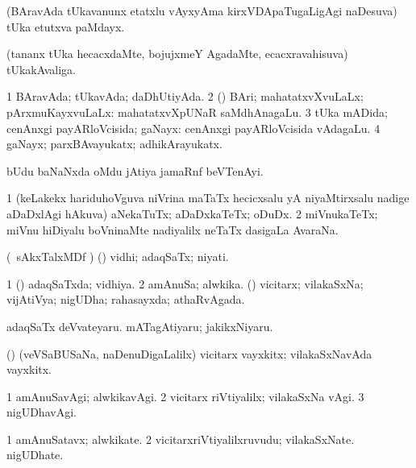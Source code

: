\bentry
{} 
\gl{\nA}
\expl{}
\bmng
(BAravAda tUkavanunx etatxlu vAyxyAma kirxVDApaTugaLigAgi naDesuva) tUka etutxva paMdayx. 
\emng
\eentry

\bentry
{} 
\gl{\nA}
\expl{}
\bmng
(tananx tUka hecacxdaMte, bojujxmeY AgadaMte, ecacxravahisuva) tUkakAvaliga. 
\emng
\eentry

\bentry
{} 
\gl{\gu}
\bmng
\bnum
\num{1} BAravAda; tUkavAda; daDhUtiyAda. 
\num{2} (\rUpa) BAri; mahatatxvXvuLaLx; pArxmuKayxvuLaLx:  mahatatxvXpUNaR saMdhAnagaLu. 
\num{3} tUka mADida; cenAnxgi payARloVcisida; gaNayx:  cenAnxgi payARloVcisida vAdagaLu. 
\num{4} gaNayx; parxBAvayukatx; adhikArayukatx. 
\enum
\emng
\eentry

\bentry
{} 
\gl{\nA}
\expl{}
\bmng
bUdu baNaNxda oMdu jAtiya jamaRnf beVTenAyi. 
\emng
\eentry

\bentry
{} 
\gl{\nA}
\expl{}
\bmng
\bnum
\num{1} (keLakekx hariduhoVguva niVrina maTaTx hecicxsalu yA niyaMtirxsalu nadige aDaDxlAgi hAkuva) aNekaTuTx; aDaDxkaTeTx; oDuDx. 
\num{2} miVnukaTeTx; miVnu hiDiyalu boVninaMte nadiyalilx neTaTx dasigaLa AvaraNa. 
\enum
\emng
\eentry

\bentry
{} 
\gl{\nA}
\expl{}
\bmng
(\kanmu\ sAkxTalxMDf \parx) (\pArxparx) vidhi; adaqSaTx; niyati. 
\emng
\eentry

\bentry
{} 
\gl{\gu}
\expl{}
\bmng
\bnum
\num{1} (\pArxparx) adaqSaTxda; vidhiya. 
\num{2} amAnuSa; alwkika. (\AmA) vicitarx; vilakaSxNa; vijAtiVya; nigUDha; rahasayxda; athaRvAgada. 
\enum
\emng

\noindent 
\gl{\pagu}
\expl{}
\bmng
\banum
{} adaqSaTx deVvateyaru. 
 mATagAtiyaru; jakikxNiyaru. 
\eanum
\emng
\eentry

\bentry
{} 
\gl{\nA}
\expl{}
\bmng
(\AmA) (veVSaBUSaNa, naDenuDigaLalilx) vicitarx vayxkitx; vilakaSxNavAda vayxkitx. 
\emng
\eentry

\bentry
{} 
\gl{\kirxvi}
\expl{}
\bmng
\bnum
\num{1} amAnuSavAgi; alwkikavAgi. 
\num{2} vicitarx riVtiyalilx; vilakaSxNa vAgi. 
\num{3} nigUDhavAgi. 
\enum
\emng
\eentry

\bentry
{} 
\gl{\nA}
\expl{}
\bmng
\bnum
\num{1} amAnuSatavx; alwkikate. 
\num{2} vicitarxriVtiyalilxruvudu; vilakaSxNate. nigUDhate. 
\enum
\emng
\eentry

